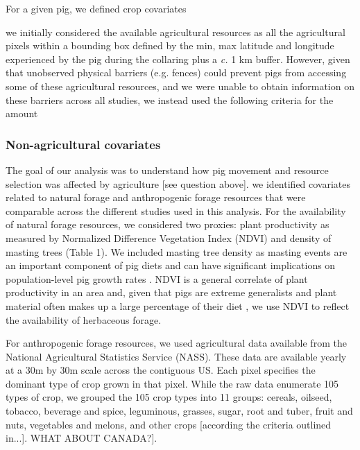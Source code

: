\documentclass[a4paper]{article}
\begin{document}
For a given pig, we defined crop covariates 

we initially considered the available agricultural resources as all the agricultural pixels within a bounding box defined by the min, max latitude and longitude experienced by the pig during the collaring plus a \emph{c.} 1 km buffer.  However, given that unobserved physical barriers (e.g. fences) could prevent pigs from accessing some of these agricultural resources, and we were unable to obtain information on these barriers across all studies, we instead used the following criteria for the amount 

\subsubsection*{Non-agricultural covariates}

The goal of our analysis was to understand how pig movement and resource selection was affected by agriculture [see question above].    we identified covariates related to natural forage and anthropogenic forage resources that were comparable across the different studies used in this analysis.  For the availability of natural forage resources, we considered two proxies: plant productivity as measured by Normalized Difference Vegetation Index (NDVI) and density of masting trees (Table 1). We included masting tree density as masting events are an important component of pig diets and can have significant implications on population-level pig growth rates \citep[e.g.][]{Bieber2005}.  NDVI is a general correlate of plant productivity in an area \citep{Pettorelli2005} and, given that pigs are extreme generalists and plant material often makes up a large percentage of their diet \citep{Mayer2009}, we use NDVI to reflect the availability of herbaceous forage.  


For anthropogenic forage resources, we used agricultural data available from the National Agricultural Statistics Service (NASS). These data are available yearly at a 30m by 30m scale across the contiguous US. Each pixel specifies the dominant type of crop grown in that pixel.  While the raw data enumerate 105 types of crop, we grouped the 105 crop types into 11 groups: cereals, oilseed, tobacco, beverage and spice, leguminous, grasses, sugar, root and tuber, fruit and nuts, vegetables and melons, and other crops [according the criteria outlined in...]. WHAT ABOUT CANADA?]. 
\end{document}
